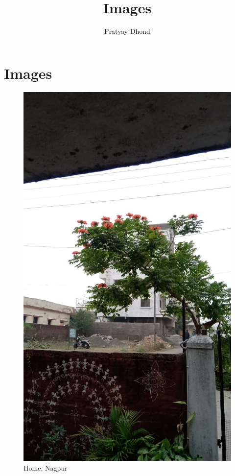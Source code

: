 \documentclass{article}
\title{Images}
\author{Pratyay Dhond}
\begin{document}
\section{Images}
	\begin{figure}[!ht]
	  \includegraphics[scale=0.3]{home.jpeg}
	  \caption{Home, Nagpur}
	  \label{fig:Home}
	\vspace{2cm}
	\end{figure}
\end{document}
